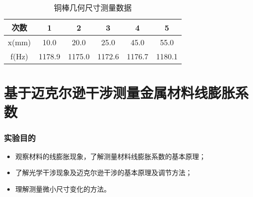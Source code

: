 \documentclass[a4paper,utf8]{article}
\begin{document}
\begin{table}[!ht]
    \caption{铜棒几何尺寸测量数据}\label{tab:copperFreq}
    \begin{tabular}{c *{5}{S[table-format=4.1]}} \toprule
        次数 & {1} & {2} & {3} & {4} & {5}  \\ \midrule
        x(\unit{\mm}) & 10.0 & 20.0 & 25.0 & 45.0 & 55.0 \\ 
        f(\unit{\Hz}) & 1178.9 & 1175.0 & 1172.6 & 1176.7 & 1180.1 \\\bottomrule
    \end{tabular}
\end{table}

\begin{figure}[!ht]
    \caption{}
\end{figure}
\part{基于迈克尔逊干涉测量金属材料线膨胀系数}
\setcounter{section}{0}
\section{实验目的}
    \begin{itemize}
        \item 观察材料的线膨胀现象，了解测量材料线膨胀系数的基本原理；
        \item 了解光学干涉现象及迈克尔逊干涉的基本原理及调节方法； 
        \item 理解测量微小尺寸变化的方法。
    \end{itemize}
\end{document}

